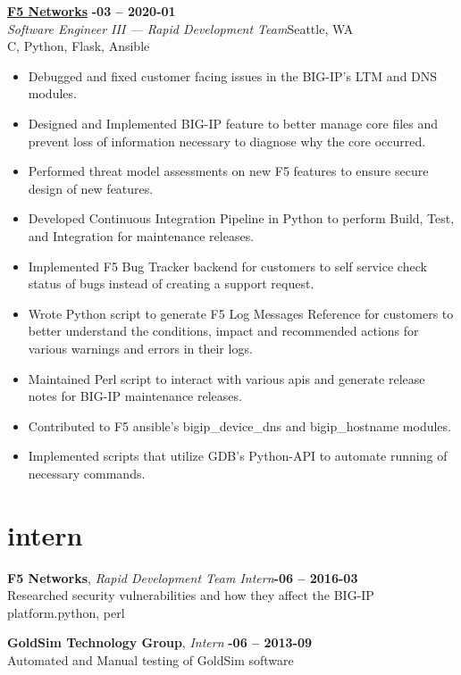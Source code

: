 \documentclass[margin,10pt]{res}
\begin{document}
\begin{resume}
    \href{https://www.f5.com/}{\textbf{F5 Networks}} \hfill \textsc{\bfseries{}-03 -- 2020-01}\\
    \textit{Software Engineer III --- Rapid Development Team}\hfill Seattle, WA\\
    C, Python, Flask, Ansible
    \begin{itemize}
        \item Debugged and fixed customer facing issues in the BIG-IP's LTM and DNS modules.
        \item Designed and Implemented BIG-IP feature to better manage core files and prevent loss of information necessary to
        diagnose why the core occurred.
        \item Performed threat model assessments on new F5 features to ensure secure design of new features.
        \item Developed Continuous Integration Pipeline in Python to perform Build, Test, and Integration for maintenance releases.
        \item Implemented F5 Bug Tracker backend for customers to self service check status of bugs instead of creating a support
        request.
        \item Wrote Python script to generate F5 Log Messages Reference for customers to better understand the conditions, impact
        and recommended actions for various warnings and errors in their logs.
        \item Maintained Perl script to interact with various apis and generate release notes for BIG-IP maintenance releases.
        \item Contributed to F5 ansible's bigip\_device\_dns and bigip\_hostname modules.
        \item Implemented scripts that utilize GDB's Python-API to automate running of necessary commands.
    \end{itemize}
\section{\sc \lsstyle intern}
    \textbf{F5 Networks}, \textit{Rapid Development Team Intern}\hfill \textsc{\bfseries{}-06 -- 2016-03}\\
    Researched security vulnerabilities and how they affect the BIG-IP platform.\hfill python, perl

    \textbf{GoldSim Technology Group}, \textit{Intern} \hfill \textsc{\bfseries{}-06 -- 2013-09}\\
    Automated and Manual testing of GoldSim software


\end{resume}
\end{document}
